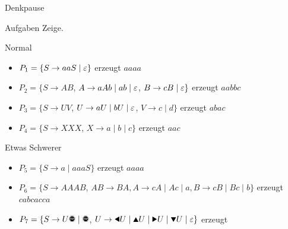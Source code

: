 {
\begin{frame}{Denkpause}
    \begin{alertblock}{Aufgaben}
        Zeige.
    \end{alertblock}
    \begin{block}{Normal}
        \begin{itemize}
            \item $P_1=\{S\rightarrow aaS\;|\;\varepsilon\}$ erzeugt $aaaa$
            \item $P_2=\{S\rightarrow AB$, $A\rightarrow aAb \;|\; ab\; |\;\varepsilon$, $B\rightarrow cB \;|\; \varepsilon\}$ erzeugt $aabbc$
            \item $P_3=\{S\rightarrow UV$, $U\rightarrow aU \;|\; bU \; |\; \varepsilon$, $V\rightarrow c \;|\; d\}$ erzeugt $abac$
            \item $P_4=\{S\rightarrow XXX$, $X\rightarrow a \;|\; b \;|\; c\}$ erzeugt $aac$
        \end{itemize}
    \end{block}
    \begin{block}{Etwas Schwerer}
        \begin{itemize}
            \item $P_5=\{S\rightarrow a \;|\; aaaS\}$ erzeugt $aaaa$
            \item $P_6=\{S\rightarrow AAAB$, $AB\rightarrow BA,
                      A\rightarrow cA \;|\; Ac \;|\; a,
                      B\rightarrow cB \;|\; Bc \;|\; b\}$ erzeugt $cabcacca$
            \item $P_7=\{S\rightarrow U\text{\Stopsign} \;|\; \text{\Stopsign}$, $U\rightarrow \text{\Rewind} U \;|\; \text{\MoveUp} U \;|\; \text{\Forward} U \;|\; \text{\MoveDown} U \;|\;\emptyWord\}$ erzeugt \Forward\Stopsign
        \end{itemize}
    \end{block}
\end{frame}
}

